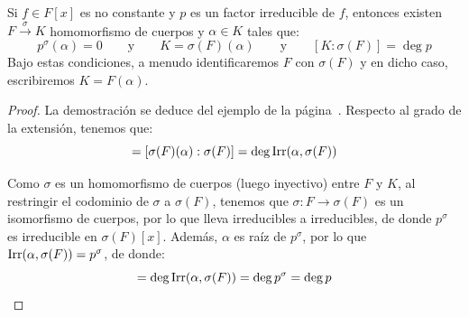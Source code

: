 \begin{lema}\label{lema:cuerpo_descomposicion}
    Si $f\in F[x]$ es no constante y $p$ es un factor irreducible de $f$, entonces existen $F\stackrel{\sigma}{\to}K$ homomorfismo de cuerpos y $\alpha\in K$ tales que:
    \begin{equation*}
        p^\sigma(\alpha) = 0 \qquad \text{y}\qquad  K = \sigma(F)(\alpha)
        \qquad \text{y}\qquad [K:\sigma(F)] = \deg p
    \end{equation*}
    Bajo estas condiciones, a menudo identificaremos $F$ con $\sigma(F)$ y en dicho caso, escribiremos $K= F(\alpha)$.
    \begin{proof}
        La demostración se deduce del ejemplo de la página~\pageref{ejemplo:cuerpo_descomposicion}. Respecto al grado de la extensión, tenemos que:
        \begin{equation*}
            [K:\sigma(F)] = [\sigma(F)(\alpha):\sigma(F)] = \deg \Irr(\alpha,\sigma(F))
        \end{equation*}

        Como $\sigma$ es un homomorfismo de cuerpos (luego inyectivo) entre $F$ y $K$, al restringir el codominio de $\sigma$ a $\sigma(F)$, tenemos que $\sigma:F\to \sigma(F)$ es un isomorfismo de cuerpos, por lo que lleva irreducibles a irreducibles, de donde $p^\sigma$ es irreducible en $\sigma(F)[x]$. Además, $\alpha$ es raíz de $p^\sigma$, por lo que $\operatorname{Irr}(\alpha,\sigma(F)) = p^\sigma$, de donde:
        \begin{equation*}
            [K:\sigma(F)] = \deg \Irr(\alpha,\sigma(F)) = \deg p^\sigma = \deg p
        \end{equation*}    
    \end{proof}
\end{lema}

